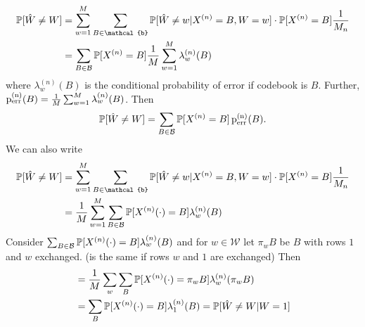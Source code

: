 \documentclass[mfit.tex]{subfiles}
\begin{document}
\begin{align*}
  \prob[\hat{W} \neq W] &= \sum_{w=1}^M \sum_{B \in \mathcal{b}} \prob[\hat{W} \neq w| X^{(n)} = B, W = w] \cdot \prob[X^{(n)} = B] \frac{1}{M_n} \\
  &= \sum_{B \in \mathcal{B}} \prob[X^{(n)} = B] \frac{1}{M} \sum_{w=1}^M  \lambda_w^{(n)}(B)
\end{align*}
where $\lambda_w^{(n)}(B)$ is the conditional probability of error if codebook is $B$.
Further, $\operatorname{p_{\text{err}}^{(n)}}(B) = \frac{1}{M} \sum_{w=1}^M \lambda_w^{(n)}(B)$.
Then
\[ \operatorname{\mathbb{P}}[\hat{W} \neq W] = \sum_{B \in \mathcal{B}} \operatorname{\mathbb{P}}[X^{(n)} = B] \operatorname{p_{\text{err}}^{(n)}}(B) \text{.} \]
We can also write
\begin{align*}
   \prob[\hat{W} \neq W] &= \sum_{w=1}^M \sum_{B \in \mathcal{b}} \prob[\hat{W} \neq w| X^{(n)} = B, W = w] \cdot \prob[X^{(n)} = B] \frac{1}{M_n} \\
   &= \frac{1}{M} \sum_{w=1}^M \sum_{B \in \mathcal{B}} \prob[X^{(n)}(\cdot) = B] \lambda_w^{(n)}(B)
\end{align*}
Consider $\sum_{B \in \mathcal{B}} \operatorname{\mathbb{P}}[X^{(n)}(\cdot) = B] \lambda_w^{(n)}(B)$ and for $w \in \mathcal{W}$ let $\pi_w B$ be $B$ with rows $1$ and $w$ exchanged.
(is the same if rows $w$ and $1$ are exchanged)
Then
\begin{align*}
  &= \frac{1}{M} \sum_w \sum_B \operatorname{\mathbb{P}}[X^{(n)}(\cdot) = \pi_w B] \lambda_w^{(n)}( \pi_w B) \\
  &= \sum_B \operatorname{\mathbb{P}}[X^{(n)}(\cdot) = B] \lambda_1^{(n)}(B) = \operatorname{\mathbb{P}}[\hat{W} \neq W | W = 1]
\end{align*}
\end{document}
